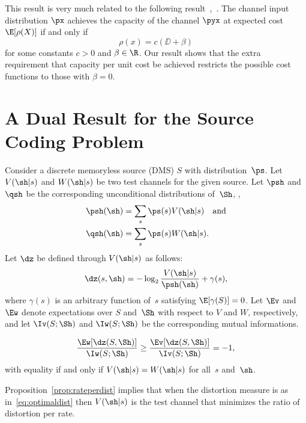 \begin{remark}
  \label{rem:tcontc1}
  This result is very much related to the following result~\cite[Section~2.3,
  Problem~2]{CsiszarK1981},~\cite{GastparRV2003}. The channel input
  distribution $\px$ achieves the capacity of the channel $\pyx$ at expected
  cost $\E[\rho(X)]$ if and only if
  \[ \rho(x) = c(\DD + \beta) \]
  for some constants $c > 0$ and $\beta \in \R$. Our result shows that the extra
  requirement that capacity per unit cost be achieved restricts the possible
  cost functions to those with $\beta = 0$.
\end{remark}


\section{A Dual Result for the Source Coding Problem}
\label{sec:rddual}

Consider a discrete memoryless source (DMS) $S$ with distribution~$\ps$.
Let $V(\sh|s)$ and $W(\sh|s)$ be two test channels for the given source. 
Let $\psh$ and $\qsh$ be the
corresponding unconditional distributions of~$\Sh$, \ie,
\begin{align*}
  \psh(\sh) &= \sum_s \ps(s) V(\sh|s) \quad\text{and} \\
  \qsh(\sh) &= \sum_s \ps(s) W(\sh|s).
\end{align*}
Let $\dz$ be defined through $V(\sh|s)$ as follows:
\begin{equation}
  \label{eq:optimaldist}
   \dz(s, \sh) = -\log_2 \frac{V(\sh|s)}{\psh(\sh)} + \gamma(s),
 \end{equation}
 where $\gamma(s)$ is an arbitrary function of~$s$ satisfying $\E[\gamma(S)] =
 0$. 
Let $\Ev$ and $\Ew$ denote expectations over $S$ and~$\Sh$ with respect to $V$
and $W$, respectively, and let $\Iv(S;\Sh)$ and $\Iw(S;\Sh)$ be the
corresponding mutual informations. 

\begin{proposition}
  \label{prop:rateperdist}
  \begin{equation}
    \label{eq:rateperdist}
    \frac{\Ew[\dz(S,\Sh)]}{\Iw(S;\Sh)} \ge \frac{\Ev[\dz(S,\Sh)]}{\Iv(S;\Sh)} =
    -1,
  \end{equation}
  with equality if and only if $V(\sh|s) = W(\sh|s)$ for all~$s$ and~$\sh$.
\end{proposition}

Proposition~\ref{prop:rateperdist} implies that when the distortion measure is
as in~\eqref{eq:optimaldist} then $V(\sh|s)$ is the test channel that minimizes
the ratio of distortion per rate.

